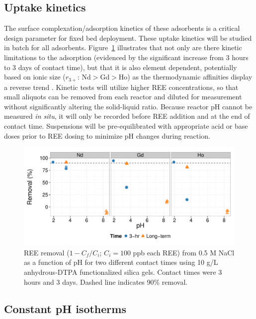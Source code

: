 \subsection{Uptake kinetics}

The surface complexation/adsorption kinetics of these adsorbents is a critical design parameter for fixed bed deployment.
These uptake kinetics will be studied in batch for all adsorbents.
Figure~\ref{fig:ads-edge-kinetics} illustrates that not only are there kinetic limitations to the adsorption (evidenced by the significant increase from 3 hours to 3 days of contact time), but that it is also element dependent, potentially based on ionic size ($r_{3+}$: Nd$>$Gd$>$Ho) as the thermodynamic affinities display a reverse trend \citep{Grimes_JSC_2014}.
Kinetic tests will utilize higher REE concentrations, so that small aliquots can be removed from each reactor and diluted for measurement without significantly altering the solid-liquid ratio.
Because reactor pH cannot be measured \textit{in situ}, it will only be recorded before REE addition and at the end of contact time.
Suspensions will be pre-equilibrated with appropriate acid or base doses prior to REE dosing to minimize pH changes during reaction.

\begin{figure}[htbp]
\begin{center}
\includegraphics[width = \textwidth]{proposal_figures/pseudo-eq-ads_2015-09-23.pdf}
\caption{REE removal ($1 - C_f/C_i$; $C_i = 100$ ppb each REE) from 0.5 M NaCl as a function of pH for two different contact times using 10 g/L anhydrous-DTPA functionalized silica gels.
Contact times were 3 hours and 3 days.
Dashed line indicates 90\% removal.}\label{fig:ads-edge-kinetics}
\end{center}
\end{figure}

\subsection{Constant pH isotherms}

